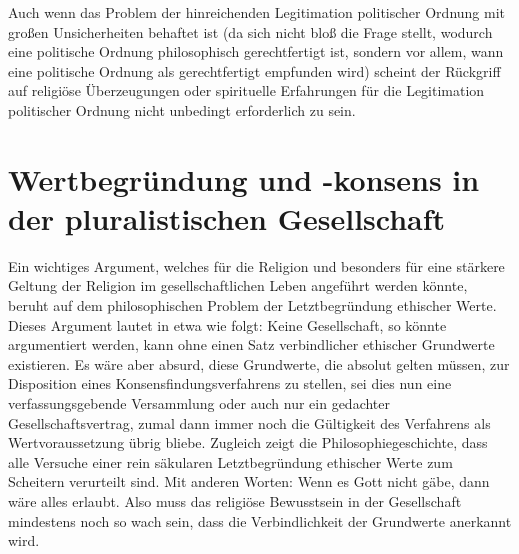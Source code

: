
Auch wenn das Problem der hinreichenden Legitimation politischer Ordnung mit
großen Unsicherheiten behaftet ist (da sich nicht bloß die Frage stellt,
wodurch eine politische Ordnung philosophisch gerechtfertigt ist, sondern vor
allem, wann eine politische Ordnung als gerechtfertigt empfunden wird) scheint
der Rückgriff auf religiöse Überzeugungen oder spirituelle Erfahrungen für die
Legitimation politischer Ordnung nicht unbedingt erforderlich zu sein.

\section{Wertbegründung und -konsens in der pluralistischen
  Gesellschaft} 
\label{Wertbegruendung}

Ein wichtiges Argument, welches für die Religion und besonders für eine
stärkere Geltung der Religion im gesellschaftlichen Leben angeführt
werden könnte, beruht auf dem philosophischen Problem der
Letztbegründung ethischer Werte. Dieses Argument lautet in etwa wie
folgt: Keine Gesellschaft, so könnte argumentiert werden, kann ohne
einen Satz verbindlicher ethischer Grundwerte existieren. Es wäre aber
absurd, diese Grundwerte, die absolut gelten müssen, zur Disposition
eines Konsensfindungsverfahrens zu stellen, sei dies nun eine
verfassungsgebende Versammlung oder auch nur ein gedachter
Gesellschaftsvertrag, zumal dann immer noch die Gültigkeit des
Verfahrens als Wertvoraussetzung übrig bliebe. Zugleich zeigt die
Philosophiegeschichte, dass alle Versuche einer rein säkularen
Letztbegründung ethischer Werte zum Scheitern verurteilt sind. Mit
anderen Worten: Wenn es Gott nicht gäbe, dann wäre alles erlaubt. Also
muss das religiöse Bewusstsein in der Gesellschaft mindestens noch so wach
sein, dass die Verbindlichkeit der Grundwerte anerkannt wird.

